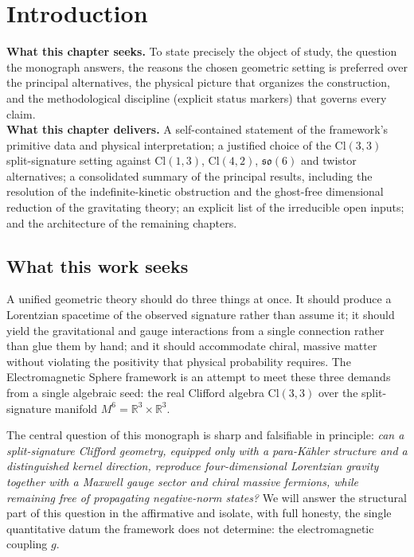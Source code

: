 \documentclass[11pt,oneside]{book}
\newcommand{\Cl}{\mathrm{Cl}}                     %
\newcommand{\RR}{\mathbb{R}}
\newcommand{\so}{\mathfrak{so}}
\theoremstyle{plain}
\theoremstyle{definition}
\theoremstyle{remark}
\begin{document}
\mainmatter
\chapter{Introduction}
\label{ch:intro}

\begin{leavesbox}
\textbf{What this chapter seeks.} To state precisely the object of study, the
question the monograph answers, the reasons the chosen geometric setting is
preferred over the principal alternatives, the physical picture that organizes
the construction, and the methodological discipline (explicit status markers)
that governs every claim.\\[2pt]
\textbf{What this chapter delivers.} A self-contained statement of the framework's
primitive data and physical interpretation; a justified choice of the
$\Cl(3,3)$ split-signature setting against $\Cl(1,3)$, $\Cl(4,2)$, $\so(6)$ and
twistor alternatives; a consolidated summary of the principal results, including
the resolution of the indefinite-kinetic obstruction and the ghost-free
dimensional reduction of the gravitating theory; an explicit list of the
irreducible open inputs; and the architecture of the remaining chapters.
\end{leavesbox}

\section{What this work seeks}
\label{sec:seeks}

A unified geometric theory should do three things at once. It should produce a
Lorentzian spacetime of the observed signature rather than assume it; it should
yield the gravitational and gauge interactions from a single connection rather
than glue them by hand; and it should accommodate chiral, massive matter without
violating the positivity that physical probability requires. The Electromagnetic
Sphere framework is an attempt to meet these three demands from a single
algebraic seed: the real Clifford algebra $\Cl(3,3)$ over the split-signature
manifold $M^6=\RR^3\times\RR^3$.

The central question of this monograph is sharp and falsifiable in principle:
\emph{can a split-signature Clifford geometry, equipped only with a para-K\"ahler
structure and a distinguished kernel direction, reproduce four-dimensional
Lorentzian gravity together with a Maxwell gauge sector and chiral massive
fermions, while remaining free of propagating negative-norm states?} We will
answer the structural part of this question in the affirmative and isolate, with
full honesty, the single quantitative datum the framework does not determine: the
electromagnetic coupling $g$.
\end{document}
